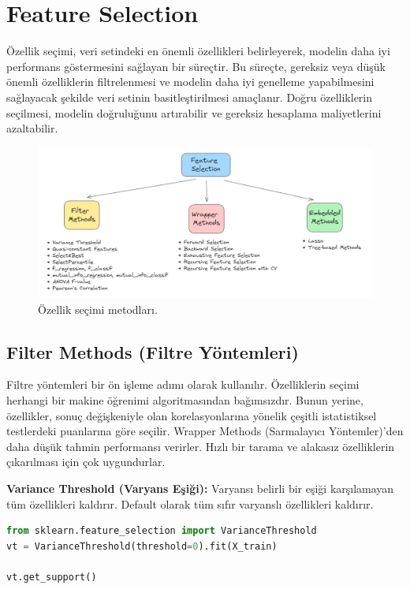 \section{Feature Selection}
Özellik seçimi, veri setindeki en önemli özellikleri belirleyerek, modelin daha iyi performans göstermesini sağlayan bir süreçtir. Bu süreçte, gereksiz veya düşük önemli özelliklerin filtrelenmesi ve modelin daha iyi genelleme yapabilmesini sağlayacak şekilde veri setinin basitleştirilmesi amaçlanır. Doğru özelliklerin seçilmesi, modelin doğruluğunu artırabilir ve gereksiz hesaplama maliyetlerini azaltabilir.

\begin{figure}[h]
    \centering
    \includegraphics[width=1\textwidth]{images/feature_selection_methods.png}
    \caption{Özellik seçimi metodları.}
    \label{fig:enter-label}
\end{figure}

\subsection{Filter Methods (Filtre Yöntemleri)}
Filtre yöntemleri bir ön işleme adımı olarak kullanılır. Özelliklerin seçimi herhangi bir makine öğrenimi algoritmasından bağımsızdır. Bunun yerine, özellikler, sonuç değişkeniyle olan korelasyonlarına yönelik çeşitli istatistiksel testlerdeki puanlarına göre seçilir. Wrapper Methods (Sarmalayıcı Yöntemler)'den daha düşük tahmin performansı verirler. Hızlı bir tarama ve alakasız özelliklerin çıkarılması için çok uygundurlar.

\textbf{Variance Threshold (Varyans Eşiği):} Varyansı belirli bir eşiği karşılamayan tüm özellikleri kaldırır. Default olarak tüm sıfır varyanslı özellikleri kaldırır.

\begin{lstlisting}[language=Python]
from sklearn.feature_selection import VarianceThreshold
vt = VarianceThreshold(threshold=0).fit(X_train)

vt.get_support()
\end{lstlisting}

